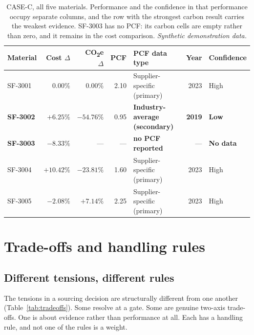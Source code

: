 \documentclass[10pt,twocolumn,a4paper]{article}
\newcommand{\co}{CO\textsubscript{2}e}
\newcommand{\dimhead}[1]{\textbf{#1}}
\newcommand{\synth}{\textit{Synthetic demonstration data.}}
\begin{document}
\begin{table}[t]
  \caption{CASE-C, all five materials. Performance and the confidence in that
  performance occupy separate columns, and the row with the strongest carbon
  result carries the weakest evidence. SF-3003 has no PCF: its carbon cells are
  empty rather than zero, and it remains in the cost comparison. \synth}
  \label{tab:casec}
  \small
  \begin{tabular}{@{}lrrrlrl@{}}
    \toprule
    \dimhead{Material} & \dimhead{Cost $\Delta$} & \dimhead{\co{} $\Delta$} &
    \dimhead{PCF} & \dimhead{PCF data type} & \dimhead{Year} & \dimhead{Confidence} \\
    \midrule
    SF-3001 & $0.00\%$ & $0.00\%$ & 2.10 & Supplier-specific (primary) & 2023 & High \\
    \textcolor{pamber}{\textbf{SF-3002}} & \textcolor{pamber}{$+6.25\%$} & \textcolor{pamber}{$\mathbf{-54.76\%}$} & \textcolor{pamber}{0.95} & \textcolor{pamber}{\textbf{Industry-average (secondary)}} & \textcolor{pamber}{\textbf{2019}} & \textcolor{pamber}{\textbf{Low}} \\
    \textbf{SF-3003} & $-8.33\%$ & --- & --- & \textbf{no PCF reported} & --- & \textbf{No data} \\
    SF-3004 & $+10.42\%$ & $-23.81\%$ & 1.60 & Supplier-specific (primary) & 2023 & High \\
    SF-3005 & $-2.08\%$ & $+7.14\%$ & 2.25 & Supplier-specific (primary) & 2023 & High \\
    \bottomrule
  \end{tabular}
\end{table}

\section{Trade-offs and handling rules}
\label{sec:tradeoffs}

\subsection{Different tensions, different rules}

The tensions in a sourcing decision are structurally different from one another
(Table~\ref{tab:tradeoffs}). Some resolve at a gate. Some are genuine two-axis
trade-offs. One is about evidence rather than performance at all. Each has a
handling rule, and not one of the rules is a weight.
\end{document}
